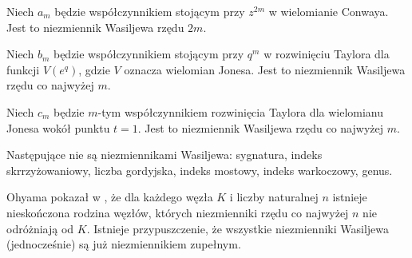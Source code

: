 \begin{example}
	Niech $a_m$ będzie współczynnikiem stojącym przy $z^{2m}$ w wielomianie Conwaya.
	Jest to niezmiennik Wasiljewa rzędu $2m$.
\end{example}

\begin{example}
	Niech $b_m$ będzie współczynnikiem stojącym przy $q^m$ w rozwinięciu Taylora dla funkcji $V(e^q)$, gdzie $V$ oznacza wielomian Jonesa.
	Jest to niezmiennik Wasiljewa rzędu co najwyżej $m$.
\end{example}

\begin{example}
	Niech $c_m$ będzie $m$-tym współczynnikiem rozwinięcia Taylora dla wielomianu Jonesa wokół punktu $t = 1$.
	Jest to niezmiennik Wasiljewa rzędu co najwyżej $m$.
\end{example}


Następujące nie są niezmiennikami Wasiljewa: sygnatura, indeks skrrzyżowaniowy, liczba gordyjska, indeks mostowy, indeks warkoczowy, genus.

Ohyama pokazał w \cite{ohyama95}, że dla każdego węzła $K$ i liczby naturalnej $n$ istnieje nieskończona rodzina węzłów, których niezmienniki rzędu co najwyżej $n$ nie odróżniają od $K$.
Istnieje przypuszczenie, że wszystkie niezmienniki Wasiljewa (jednocześnie) są już niezmiennikiem zupełnym.